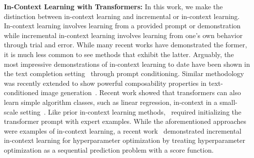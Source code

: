 {\bf In-Context Learning with Transformers:} In this work, we make the distinction between in-context learning and incremental or in-context learning. In-context learning involves learning from a provided prompt or demonstration while incremental in-context learning involves learning from one's own behavior through trial and error.
While many recent works have demonstrated the former, it is much less common to see methods that exhibit the latter. Arguably, the most impressive demonstrations of in-context learning to date have been shown in the text completion setting~\citep{radford2018improving, chen2020igpt, brown2020gpt3} through prompt conditioning. Similar methodology was recently extended to show powerful composability properties in text-conditioned image generation~\citep{yu2022parti}. Recent work showed that transformers can also learn simple algorithm classes, such as linear regression, in-context in a small-scale setting~\citep{garg2022incontext}. Like prior in-context learning methods,~\citet{garg2022incontext} required initializing the transformer prompt with expert examples. While the aforementioned approaches were examples of in-context learning, a recent work~\citep{chen2022optformer} demonstrated incremental in-context learning for hyperparameter optimization by treating hyperparameter optimization as a sequential prediction problem with a score function.